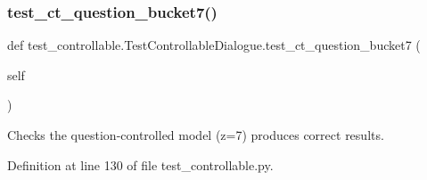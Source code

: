 \subsubsection{\texorpdfstring{test\+\_\+ct\+\_\+question\+\_\+bucket7()}{test\_ct\_question\_bucket7()}}
{\footnotesize\ttfamily def test\+\_\+controllable.\+Test\+Controllable\+Dialogue.\+test\+\_\+ct\+\_\+question\+\_\+bucket7 (\begin{DoxyParamCaption}\item[{}]{self }\end{DoxyParamCaption})}

\begin{DoxyVerb}Checks the question-controlled model (z=7) produces correct results.
\end{DoxyVerb}
 

Definition at line 130 of file test\+\_\+controllable.\+py.


